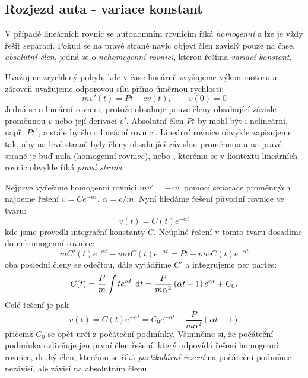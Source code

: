 \documentclass[a4paper, 12pt]{book}
\theoremstyle{definition}
\def\d{\,{\rm d}}               %
\def\df#1{\emph{#1}}
\begin{document}
\subsection{Rozjezd auta - variace konstant}
V případě lineárních rovnic se autonomním rovnicím říká \df{homogenní} a lze je vždy řešit separací. Pokud se na pravé straně navíc objeví člen
zavislý pouze na čase, \df{absolutní člen}, jedná se o \df{nehomogenní rovnici}, kterou řešíma \df{variací konstant}.

Uvažujme zrychlený pohyb, kde v čase lineárně zvyšujeme výkon motoru a zároveň uvažujeme odporovou sílu přímo úměrnou rychlosti:
\[
  mv'(t) = Pt - c v(t), \qquad v(0)=0
\]
Jedná se o lineární rovnici, protože obsahuje pouze členy obsahující závisle proměnnou $v$ nebo její derivaci $v'$. Absolutní člen $Pt$ by mohl být i nelineární,
např. $Pt^2$, a stále by šlo o lineární rovnici. Lineární rovnice obvykle zapisujeme tak, aby na levé straně byly členy obsahující závislou proměnnou a na pravé straně je buď nula (homogenní rovnice),
nebo , kterému se v kontextu lineárních rovnic obvykle říká \df{pravá strana}.

Nejprve vyřešíme homogenní rovnici $mv'= - cv$, pomocí separace proměnných najdeme řešení $ v=Ce^{-\alpha t}$, $\alpha = c/m$. Nyní hledáme řešení původní rovnice ve tvaru:
\[
   v(t) = C(t) e^{-\alpha t}
\]
kde jsme provedli  integrační konstanty $C$. Neúplné řešení v tomto tvaru do\-sa\-dí\-me do nehomogenní rovnice:
\[
  m C'(t) e^{-\alpha t} - m \alpha C(t) e^{-\alpha t} = Pt - m \alpha C(t) e^{-\alpha t}
\]
oba poslední členy se odečtou, dále vyjádříme $C'$ a integrujeme per partes:
\[
  C(t) = \frac{P}{m} \int te^{\alpha t} \; \d t = \frac{P}{m\alpha^2}\left(\alpha t - 1\right)e^{\alpha t} + C_0.
\]
Celé řešení je pak
\[
  v(t) = C(t) e^{-\alpha t} = C_0 e^{-\alpha t} + \frac{P}{m\alpha^2} (\alpha t - 1)
\]
přičemž $C_0$ se opět určí z počáteční podmínky. Všimněme si, že počáteční podmínka ovlivňuje jen první člen řešení, který odpovídá řešení 
homogenní rovnice, druhý člen, kterému se říká \df{partikulární řešení} na počáteční podmínce nezávisí, ale závisí na absolutním členu. 
\end{document}
